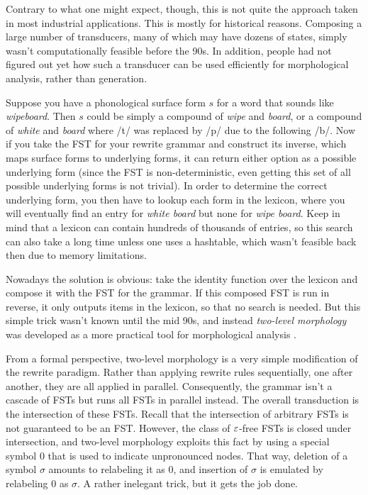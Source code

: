 Contrary to what one might expect, though, this is not quite the approach taken in most industrial applications.
This is mostly for historical reasons.
Composing a large number of transducers, many of which may have dozens of states, simply wasn't computationally feasible before the 90s.
In addition, people had not figured out yet how such a transducer can be used efficiently for morphological analysis, rather than generation.

Suppose you have a phonological surface form $s$ for a word that sounds like \emph{wipeboard}.
Then $s$ could be simply a compound of \emph{wipe} and \emph{board}, or a compound of \emph{white} and \emph{board} where /t/ was replaced by /p/ due to the following /b/.
Now if you take the FST for your rewrite grammar and construct its inverse, which maps surface forms to underlying forms, it can return either option as a possible underlying form (since the FST is non-deterministic, even getting this set of all possible underlying forms is not trivial).
In order to determine the correct underlying form, you then have to lookup each form in the lexicon, where you will eventually find an entry for \emph{white board} but none for \emph{wipe board}.
Keep in mind that a lexicon can contain hundreds of thousands of entries, so this search can also take a long time unless one uses a hashtable, which wasn't feasible back then due to memory limitations.

Nowadays the solution is obvious: take the identity function over the lexicon and compose it with the FST for the grammar.
If this composed FST is run in reverse, it only outputs items in the lexicon, so that no search is needed.
But this simple trick wasn't known until the mid 90s, and instead \emph{two-level morphology} was developed as a more practical tool for morphological analysis \citep{Koskenniemi83}.

From a formal perspective, two-level morphology is a very simple modification of the rewrite paradigm.
Rather than applying rewrite rules sequentially, one after another, they are all applied in parallel.
Consequently, the grammar isn't a cascade of FSTs but runs all FSTs in parallel instead.
The overall transduction is the intersection of these FSTs.
Recall that the intersection of arbitrary FSTs is not guaranteed to be an FST\@.
However, the class of $\varepsilon$-free FSTs is closed under intersection, and two-level morphology exploits this fact by using a special symbol $0$ that is used to indicate unpronounced nodes.
That way, deletion of a symbol $\sigma$ amounts to relabeling it as $0$, and insertion of $\sigma$ is emulated by relabeling $0$ as $\sigma$.
A rather inelegant trick, but it gets the job done.


